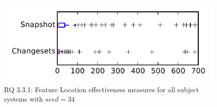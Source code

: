 
\begin{figure}
\centering
\includegraphics[height=0.4\textheight]{figures/flt_seed/rq1_tiny_34}
\caption{RQ 3.3.1: Feature Location effectiveness measures for all subject systems with $seed=34$}
\label{fig:flt_seed:rq1:tiny}
\end{figure}
